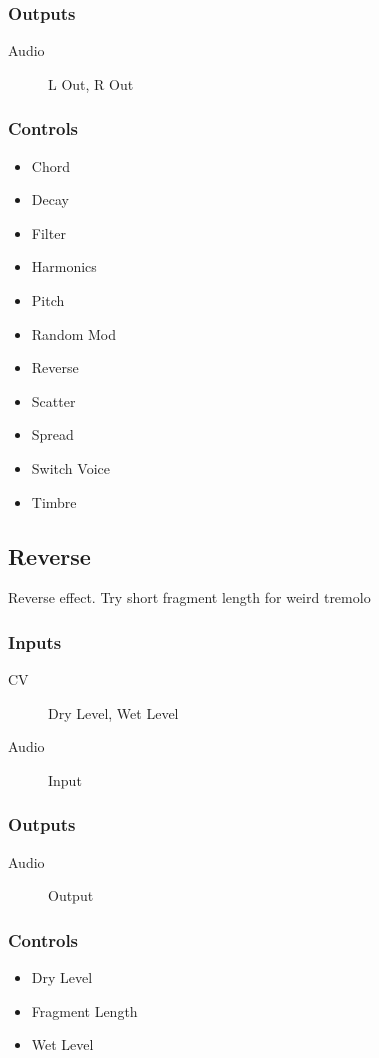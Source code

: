 \subsubsection{Outputs}
\begin{description}
\item [Audio] L Out, R Out
\end{description}

\subsubsection{Controls}
\begin{itemize}
\item Chord
\item Decay
\item Filter
\item Harmonics
\item Pitch
\item Random Mod
\item Reverse
\item Scatter
\item Spread
\item Switch Voice
\item Timbre
\end{itemize}

\subsection{Reverse}

Reverse effect. Try short fragment length for weird tremolo



\subsubsection{Inputs}
\begin{description}
\item [CV] Dry Level, Wet Level
\item [Audio] Input
\end{description}

\subsubsection{Outputs}
\begin{description}
\item [Audio] Output
\end{description}

\subsubsection{Controls}
\begin{itemize}
\item Dry Level
\item Fragment Length
\item Wet Level
\end{itemize}

